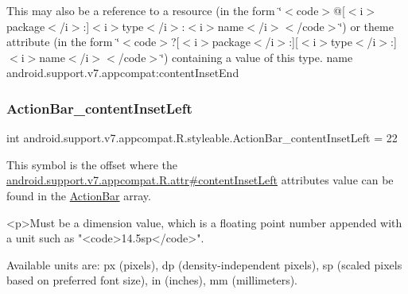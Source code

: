This may also be a reference to a resource (in the form \char`\"{}$<$code$>$@\mbox{[}$<$i$>$package$<$/i$>$\+:\mbox{]}$<$i$>$type$<$/i$>$\+:$<$i$>$name$<$/i$>$$<$/code$>$\char`\"{}) or theme attribute (in the form \char`\"{}$<$code$>$?\mbox{[}$<$i$>$package$<$/i$>$\+:\mbox{]}\mbox{[}$<$i$>$type$<$/i$>$\+:\mbox{]}$<$i$>$name$<$/i$>$$<$/code$>$\char`\"{}) containing a value of this type.  name android.\+support.\+v7.\+appcompat\+:content\+Inset\+End \mbox{\label{classandroid_1_1support_1_1v7_1_1appcompat_1_1R_1_1styleable_ace29bce78f0578d736528d50188dee32}} 
\subsubsection{\texorpdfstring{Action\+Bar\+\_\+content\+Inset\+Left}{ActionBar\_contentInsetLeft}}
{\footnotesize\ttfamily int android.\+support.\+v7.\+appcompat.\+R.\+styleable.\+Action\+Bar\+\_\+content\+Inset\+Left = 22\hspace{0.3cm}{\ttfamily [static]}}

This symbol is the offset where the \hyperlink{classandroid_1_1support_1_1v7_1_1appcompat_1_1R_1_1attr_a53c50cac162dcc7adf7d93be2d2bce5c}{android.\+support.\+v7.\+appcompat.\+R.\+attr\#content\+Inset\+Left} attribute\textquotesingle{}s value can be found in the \hyperlink{classandroid_1_1support_1_1v7_1_1appcompat_1_1R_1_1styleable_a5941dc15714398e9ec9afaa0155cc1cf}{Action\+Bar} array.

\begin{DoxyVerb}      <p>Must be a dimension value, which is a floating point number appended with a unit such as "<code>14.5sp</code>".
\end{DoxyVerb}
 Available units are\+: px (pixels), dp (density-\/independent pixels), sp (scaled pixels based on preferred font size), in (inches), mm (millimeters). 

